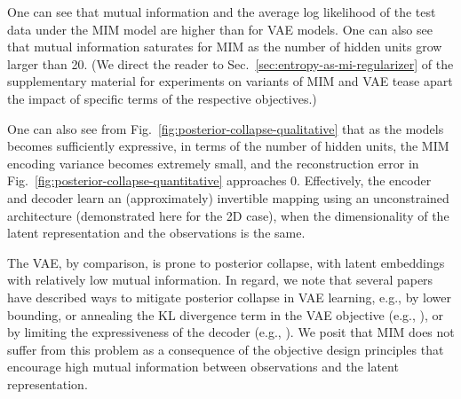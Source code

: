One can see that mutual information and the average log likelihood 
of the test data under the MIM model are higher than for VAE models.
One can also see that mutual information saturates for MIM as the
number of hidden units grow larger than 20.
(We direct the reader to Sec.\ \ref{sec:entropy-as-mi-regularizer}
of the supplementary material for experiments on variants of 
MIM and VAE tease apart the impact of specific terms of the 
respective objectives.)

One can also see from Fig.\ \ref{fig:posterior-collapse-qualitative} that as the models 
becomes sufficiently expressive, in terms of the number of 
hidden units, the MIM encoding variance becomes extremely small,
and the reconstruction error in Fig.\ \ref{fig:posterior-collapse-quantitative} approaches 0.
Effectively, the encoder and decoder learn an (approximately) invertible mapping using 
an unconstrained architecture (demonstrated here for the 2D case), when the 
dimensionality of the latent representation and the observations is the same.

The VAE, by comparison, is prone to posterior collapse, with latent embeddings 
with relatively low mutual information. In regard, we note that several 
papers have described ways to mitigate posterior collapse in VAE learning, e.g., 
by lower bounding, or annealing the KL divergence term in the VAE objective 
(e.g., \citep{DBLP:journals/corr/abs-1711-00464,DBLP:journals/corr/abs-1901-03416}), 
or by limiting the expressiveness of the decoder (e.g., \citep{ChenKSDDSSA16}).
We posit that MIM does not suffer from this problem as a consequence of 
the objective design principles that encourage high mutual information
between observations and the latent representation.
